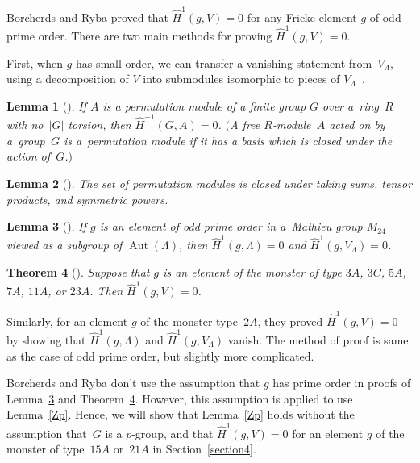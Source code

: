 \documentclass[10pt,a4paper]{amsart}
\numberwithin{equation}{section}
\newtheorem{Theorem}{Theorem}[section]
\newtheorem{Lemma}[Theorem]{Lemma}
\begin{document}
Borcherds and Ryba proved that ${\hat{H}}^1(g,V)=0$ for any Fricke element $g$ of odd prime order. There are two main methods for proving ${\hat{H}}^1(g,V)=0$.

First, when $g$ has small order, we can transfer a vanishing statement from~$V_\Lambda$, using a decomposition of $V$ into submodules isomorphic to pieces of $V_\Lambda$~\cite{BR}.

\begin{Lemma}[{\cite[Lemma 4.1]{BR}}] \label{par}
If $A$ is a permutation module of a finite group $G$ over a~ring~$R$ with no~$|G|$ torsion, then $\hat{H}^{-1}(G,A)=0$.
$($A free $R$-module~$A$ acted on by a~group~$G$ is a~permutation module if it has a basis which is closed under the action of~$G$.$)$
\end{Lemma}

\begin{Lemma}[{\cite[Lemma 4.2]{BR}}]\label{closedpar}
The set of permutation modules is closed under taking sums, tensor products, and symmetric powers.
\end{Lemma}

\begin{Lemma}[{\cite[Lemma 4.5 and Theorem~4.6]{BR}}]\label{lattice}
If $g$ is an element of odd prime order in a~Mathieu group $M_{24}$ viewed as a subgroup of $\operatorname{Aut}(\Lambda)$, then $\hat{H}^1(g,\Lambda)=0$ and $\hat{H}^1(g,V_\Lambda)=0$.
\end{Lemma}

\begin{Theorem}[{\cite[Theorem 4.7]{BR}}]\label{pA}
Suppose that $g$ is an element of the monster of type $3A$, $3C$, $5A$, $7A$, $11A$, or $23A$. Then $\hat{H}^1(g,V)=0$.
\end{Theorem}

\begin{Remark}
Similarly, for an element $g$ of the monster type~$2A$, they proved $\hat{H}^1(g,V)=0$ by showing that $\hat{H}^1(g,\Lambda)$ and $\hat{H}^1(g,V_\Lambda)$ vanish. The method of proof is same as the case of odd prime order, but slightly more complicated.
\end{Remark}

Borcherds and Ryba don't use the assumption that $g$ has prime order in proofs of Lemma~\ref{lattice} and Theorem~\ref{pA}. However, this assumption is applied to use Lemma~\ref{Zp}. Hence, we will show that Lemma~\ref{Zp} holds without the assumption that~$G$ is a $p$-group, and that $\hat{H}^1(g,V)=0$ for an element $g$ of the monster of type~$15A$ or~$21A$ in Section~\ref{section4}.
\end{document}

